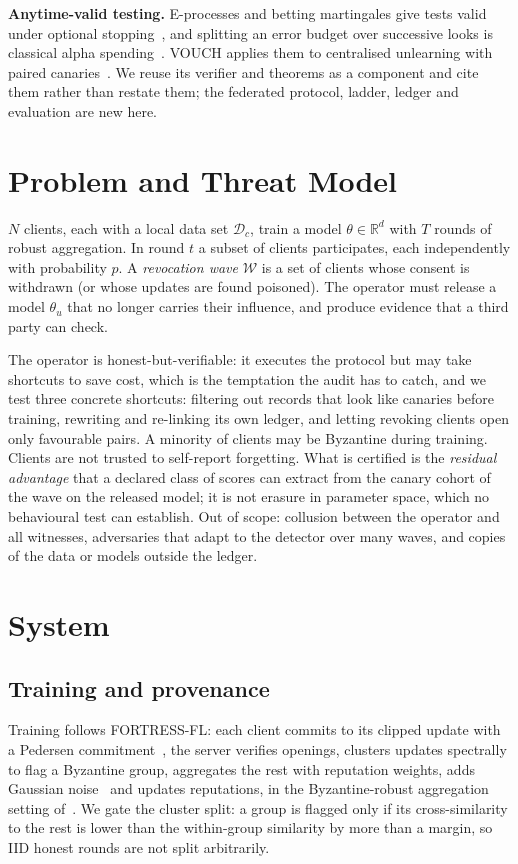 \documentclass[journal]{IEEEtran}
\newcommand{\ours}{FORTRESS-FL}
\begin{document}
\textbf{Anytime-valid testing.} E-processes and betting martingales give tests valid under optional stopping~\cite{ramdas2023,ramdas2024}, and splitting an error budget over successive looks is classical alpha spending~\cite{landemets1983}. VOUCH applies them to centralised unlearning with paired canaries~\cite{dang2026vouch}. We reuse its verifier and theorems as a component and cite them rather than restate them; the federated protocol, ladder, ledger and evaluation are new here.

\section{Problem and Threat Model}
$N$ clients, each with a local data set $\mathcal D_c$, train a model $\theta\in\mathbb R^d$ with $T$ rounds of robust aggregation. In round $t$ a subset of clients participates, each independently with probability $p$. A \emph{revocation wave} $\mathcal W$ is a set of clients whose consent is withdrawn (or whose updates are found poisoned). The operator must release a model $\theta_u$ that no longer carries their influence, and produce evidence that a third party can check.

The operator is honest-but-verifiable: it executes the protocol but may take shortcuts to save cost, which is the temptation the audit has to catch, and we test three concrete shortcuts: filtering out records that look like canaries before training, rewriting and re-linking its own ledger, and letting revoking clients open only favourable pairs. A minority of clients may be Byzantine during training. Clients are not trusted to self-report forgetting. What is certified is the \emph{residual advantage} that a declared class of scores can extract from the canary cohort of the wave on the released model; it is not erasure in parameter space, which no behavioural test can establish. Out of scope: collusion between the operator and all witnesses, adversaries that adapt to the detector over many waves, and copies of the data or models outside the ledger.

\section{System}
\subsection{Training and provenance}
Training follows \ours{}: each client commits to its clipped update with a Pedersen commitment~\cite{pedersen1991}, the server verifies openings, clusters updates spectrally to flag a Byzantine group, aggregates the rest with reputation weights, adds Gaussian noise~\cite{dwork2014} and updates reputations, in the Byzantine-robust aggregation setting of~\cite{blanchard2017}. We gate the cluster split: a group is flagged only if its cross-similarity to the rest is lower than the within-group similarity by more than a margin, so IID honest rounds are not split arbitrarily.
\end{document}
